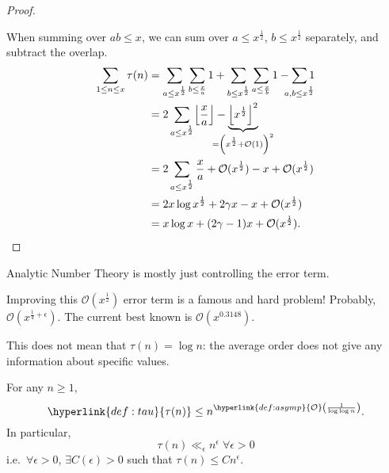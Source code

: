 \documentclass{article}
\newcommand{\bigO}{\mathcal{O}}
\DeclarePairedDelimiter\floor{\lfloor}{\rfloor}
\begin{document}
\begin{proof}
\begin{center}
  \end{center}
  When summing over $ab \leq x$, we can sum over $a \leq x^{\frac{1}{2}}$, $b \leq x^{\frac{1}{2}}$ separately, and subtract the overlap.
  \begin{align*}
    \sum_{1 \leq n \leq x} \tau(n) &= \sum_{a \leq x^{\frac{1}{2}}} \sum_{b \leq \frac{x}{a}} 1 + \sum_{b \leq x^{\frac{1}{2}}} \sum_{a \leq \frac{x}{b}} 1 - \sum_{\mathclap{a,b \leq x^{\frac{1}{2}}}} 1 \\
                                   &= 2 \sum_{a \leq x^{\frac{1}{2}}} \floor*{\frac{x}{a}} - \underbrace{\floor*{x^{\frac{1}{2}}}^2}_{\mathclap{=\left(x^{\frac{1}{2}} + \bigO(1)\right)^2}} \\
                                   &= 2 \sum_{a \leq x^{\frac{1}{2}}} \frac{x}{a} + \bigO(x^{\frac{1}{2}}) - x + \bigO(x^{\frac{1}{2}}) \\
                                   &= 2 x \log x^{\frac{1}{2}} + 2 \gamma x - x + \bigO(x^{\frac{1}{2}}) \\
                                   &= x \log x + (2 \gamma - 1) x + \bigO(x^{\frac{1}{2}}). \qedhere
  \end{align*}
\end{proof}
Analytic Number Theory is mostly just controlling the error term.
\begin{remark}
  Improving this $\bigO(x^{\frac{1}{2}})$ error term is a famous and hard problem! Probably, $\bigO(x^{\frac{1}{4} + \epsilon})$. The current best known is $\bigO(x^{0.3148})$.

  This does not mean that $\tau(n) = \log n$: the average order does not give any information about specific values.
\end{remark}
\begin{nthm}\label{thm:5}
  \newlec
  For any $n \geq 1$,
  \begin{equation*}
    \hyperlink{def:tau}{\tau(n)} \leq n^{\hyperlink{def:asymp}{\bigO}\left(\frac{1}{\log \log n}\right)}.
  \end{equation*}
  In particular,
  \begin{equation*}
    \tau(n) \ll_\epsilon n^\epsilon \; \forall \epsilon > 0
  \end{equation*}
  i.e.\ $\forall \epsilon > 0$, $\exists C(\epsilon) > 0$ such that $\tau(n) \leq C n^\epsilon$.
\end{nthm}
\end{document}
